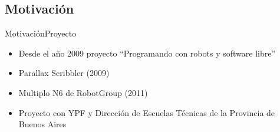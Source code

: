 \documentclass{beamer}
\newcommand{\proyecto}{``Programando con robots y software libre''}
\begin{document}
\subsection{Motivación}
\begin{frame}{Motivación}{Proyecto}
    \begin{itemize}[<+->]
        \item Desde el año 2009 proyecto \proyecto{}
        \item Parallax Scribbler (2009)
        \item Multiplo N6 de RobotGroup (2011)
        \item Proyecto con YPF y Dirección de Escuelas Técnicas
            de la Provincia de Buenos Aires
    \end{itemize}
\end{frame}
\end{document}
